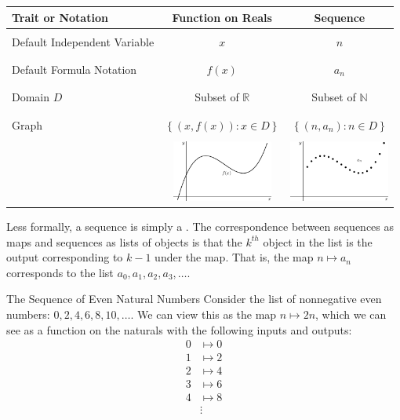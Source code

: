\begin{center}
\begin{tabular}{|l|c|c|} \hline
Trait or Notation & \bf Function on Reals & \bf Sequence  \\ \hline
 & & \\
Default Independent Variable & $x$ & $n$ \\ 
& & \\ \hline 
& & \\
Default Formula Notation & $f(x) $ & $a_n$ \\
& & \\ \hline 
& & \\
Domain $D$ & Subset of $\mathbb{R}$ & Subset of $\mathbb{N}$ \\
& & \\ \hline 
& & \\
Graph & $\left\lbrace\left(x,f(x)\right):x\in D  \right\rbrace$ & $\left\lbrace\left(n,a_n\right):n\in D  \right\rbrace$ \\
& & \\
& \includegraphics[width=125px]{ChapterSeqSer/Figures/SequenceGraph} & \includegraphics[width=125px]{ChapterSeqSer/Figures/SequenceGraph2} \\
\hline 
\end{tabular}
\end{center}

Less formally, a sequence is simply a .  The correspondence between sequences as maps and sequences as lists of objects is that the $k^{th}$ object in the list is the output corresponding to $k-1$ under the map.  That is, the map $n \mapsto a_n$ corresponds to the list $a_0,a_1,a_2,a_3,\ldots$.

\begin{example}{The Sequence of Even Natural Numbers}
Consider the list of nonnegative even numbers: $0,2,4,6,8,10,\ldots$.  We can view this as the map $n \mapsto 2n $, which we can see as a function on the naturals with the following inputs and outputs:
\begin{align*}
 0 &\mapsto 0 \\
 1 &\mapsto 2 \\
 2 &\mapsto 4 \\
 3 &\mapsto 6 \\
 4 &\mapsto 8 \\
 &\vdots  \\
\end{align*}
\end{example}

